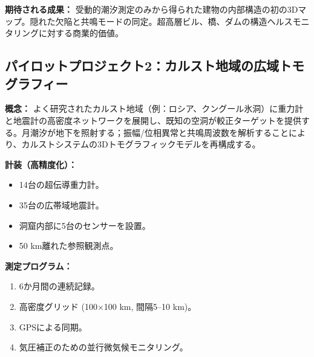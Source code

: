 \documentclass[12pt,a4paper]{article}
\theoremstyle{remark}
\begin{document}
	\textbf{期待される成果：} 受動的潮汐測定のみから得られた建物の内部構造の初の3Dマップ。隠れた欠陥と共鳴モードの同定。超高層ビル、橋、ダムの構造ヘルスモニタリングに対する商業的価値。
	
	\subsection{パイロットプロジェクト2：カルスト地域の広域トモグラフィー}
	
	\textbf{概念：} よく研究されたカルスト地域（例：ロシア、クングール氷洞）に重力計と地震計の高密度ネットワークを展開し、既知の空洞が較正ターゲットを提供する。月潮汐が地下を照射する；振幅/位相異常と共鳴周波数を解析することにより、カルストシステムの3Dトモグラフィックモデルを再構成する。
	
	\textbf{計装（高精度化）：}
	\begin{itemize}
		\item 14台の超伝導重力計。
		\item 35台の広帯域地震計。
		\item 洞窟内部に5台のセンサーを設置。
		\item 50 km離れた参照観測点。
	\end{itemize}
	
	\textbf{測定プログラム：}
	\begin{enumerate}
		\item 6か月間の連続記録。
		\item 高密度グリッド (100$\times$100 km, 間隔5–10 km)。
		\item GPSによる同期。
		\item 気圧補正のための並行微気候モニタリング。
	\end{enumerate}
	
\end{document}
